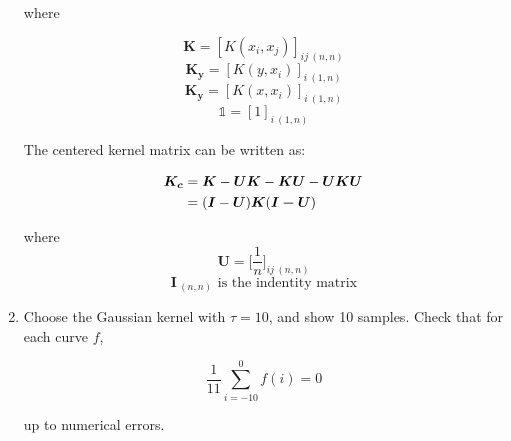 \documentclass{article}
\begin{document}
\begin{enumerate}
        where  
        
        \[\bm{K} = [K(x_i,x_j)]_{ij\ (n,n)}\] 
        \[\bm{K_y} = [K(y,x_i)]_{i\ (1,n)}\]
        \[\bm{K_y} = [K(x,x_i)]_{i\ (1,n)}\]
        \[\mathbb{1} = [1]_{i\ (1,n)}\]
        
        The centered kernel matrix can be written as: 
        
        \begin{equation} 
            \begin{aligned}
                \bm{K_c} &= \bm{K} - \bm{UK} - \bm{KU} - \bm{UKU} \\
                &= (\bm{I} - \bm{U})\bm{K}(\bm{I-U}) \notag
            \end{aligned}
        \end{equation}

        where 
        \[\bm{U} = \bigg[\frac{1}{n}\bigg]_{ij\ (n,n)}\]
        \[\bm{I}_{\ (n,n)} \mbox{ is the indentity matrix}\]

    \item Choose the Gaussian kernel with $\tau=10$, and show 10 samples. Check that for each curve $f$, 
        
        \begin{equation}
            \frac{1}{11}\sum_{i=-10}^0 f(i)=0
        \end{equation}
        
        up to numerical errors.  


\end{enumerate}
\end{document}
